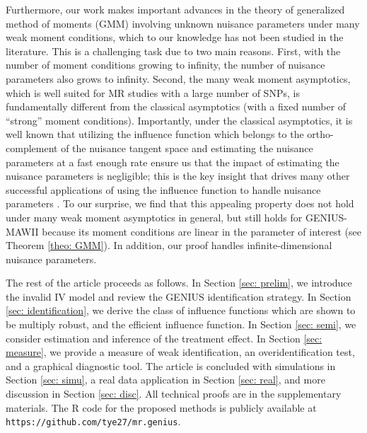 \documentclass[12pt]{article}
\begin{document}
 Furthermore, our work makes important advances in the theory of generalized method of moments (GMM) involving unknown nuisance parameters under many weak moment conditions, which to our knowledge has not been studied in the literature.   This is a challenging task due to two main reasons. First, with the number of moment conditions growing to infinity, the number of nuisance parameters also grows to infinity. Second, the many weak moment asymptotics, which is well suited for MR studies with a large number of SNPs, is fundamentally different from the classical asymptotics (with a fixed number of ``strong'' moment conditions).  Importantly,  under the classical asymptotics,  it is well known that utilizing the influence function which belongs to the ortho-complement of the nuisance tangent space and estimating the nuisance parameters at a fast enough rate ensure us that the impact of  estimating the nuisance parameters is negligible; this is the key insight that drives many other successful applications of using the influence function to handle nuisance parameters    \citep{Newey1994, Ackerberg2014aa, ning2017, robins2017hoif, Chernozhukov2018ddml, bravo2020}.	To our surprise, we find that this appealing property does not hold under many weak moment asymptotics  in general, but still holds for GENIUS-MAWII because its moment conditions are  linear in the parameter of interest  (see Theorem \ref{theo: GMM}). In addition, our proof handles infinite-dimensional nuisance parameters. 



The rest of the article proceeds as follows. In Section \ref{sec: prelim}, we introduce the invalid IV model and review the GENIUS identification strategy.  In Section \ref{sec: identification}, we derive  the class of influence functions which are shown to be multiply robust, and the efficient influence function. In Section \ref{sec: semi}, we consider estimation and inference of the treatment effect.  In Section \ref{sec: measure}, we provide a measure of weak identification, an overidentification test, and a graphical diagnostic tool. The article is concluded with simulations in Section \ref{sec: simu}, a real data application in Section \ref{sec: real}, and more discussion in Section \ref{sec: disc}. All technical proofs are in the supplementary materials. The \textsf{R} code for the proposed methods is publicly available at \texttt{https://github.com/tye27/mr.genius}.


\vspace{-5mm}
\end{document}
